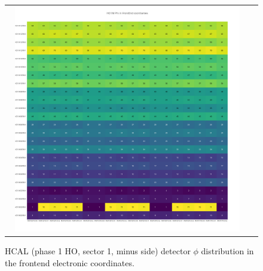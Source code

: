 \begin{figure}[htb]
 \begin{center}
  \begin{tabular}{cc}
   \includegraphics[angle=0,width=0.95\textwidth]{figures/appendix/HO1M_Phi_in_FrontEnd.png}
  \end{tabular}
  \caption{HCAL (phase 1 HO, sector 1, minus side) detector $\phi$ distribution in the frontend electronic coordinates.}
  \label{fig:lmapHO1MPhiFEC}
 \end{center}
\end{figure}
\clearpage

